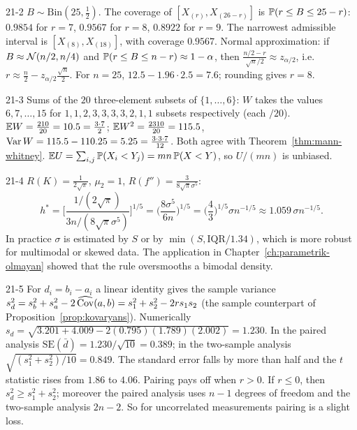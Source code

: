 \begin{solution}{21-2}
$B\sim\text{Bin}(25,\frac12)$. The coverage of $[X_{(r)},X_{(26-r)}]$ is $\P(r\le B\le25-r)$: $0.9854$ for $r=7$, $0.9567$ for $r=8$, $0.8922$ for $r=9$. The narrowest admissible interval is $[X_{(8)},X_{(18)}]$, with coverage $0.9567$. Normal approximation: if $B\approx\Normal(n/2,n/4)$ and $\P(r\le B\le n-r)\approx1-\alpha$, then $\frac{n/2-r}{\sqrt n/2}\approx z_{\alpha/2}$, i.e.\ $r\approx\frac n2-z_{\alpha/2}\frac{\sqrt n}2$. For $n=25$, $12.5-1.96\cdot2.5=7.6$; rounding gives $r=8$.
\end{solution}

\begin{solution}{21-3}
Sums of the $20$ three-element subsets of $\{1,\dots,6\}$: $W$ takes the values $6,7,\dots,15$ for $1,1,2,3,3,3,3,2,1,1$ subsets respectively (each $/20$). $\E W=\frac{210}{20}=10.5=\frac{3\cdot7}2$; $\E W^2=\frac{2310}{20}=115.5$, $\Var W=115.5-110.25=5.25=\frac{3\cdot3\cdot7}{12}$. Both agree with Theorem~\ref{thm:mann-whitney}. $\E U=\sum_{i,j}\P(X_i<Y_j)=mn\,\P(X<Y)$, so $U/(mn)$ is unbiased.
\end{solution}

\begin{solution}{21-4}
$R(K)=\frac1{2\sqrt\pi}$, $\mu_2=1$, $R(f'')=\frac3{8\sqrt\pi\sigma^5}$:
\[
h^*=\Big[\frac{1/(2\sqrt\pi)}{3n/(8\sqrt\pi\sigma^5)}\Big]^{1/5}=\Big(\frac{8\sigma^5}{6n}\Big)^{1/5}=\Big(\frac43\Big)^{1/5}\sigma n^{-1/5}\approx1.059\,\sigma n^{-1/5}.
\]
In practice $\sigma$ is estimated by $S$ or by $\min(S,\mathrm{IQR}/1.34)$, which is more robust for multimodal or skewed data. The application in Chapter~\ref{ch:parametrik-olmayan} showed that the rule oversmooths a bimodal density.
\end{solution}

\begin{solution}{21-5}
For $d_i=b_i-a_i$ a linear identity gives the sample variance $s_d^2=s_b^2+s_a^2-2\,\widehat{\Cov}(a,b)=s_1^2+s_2^2-2rs_1s_2$ (the sample counterpart of Proposition~\ref{prop:kovaryans}). Numerically $s_d=\sqrt{3.201+4.009-2(0.795)(1.789)(2.002)}=1.230$. In the paired analysis $\mathrm{SE}(\bar d)=1.230/\sqrt{10}=0.389$; in the two-sample analysis $\sqrt{(s_1^2+s_2^2)/10}=0.849$. The standard error falls by more than half and the $t$ statistic rises from $1.86$ to $4.06$. Pairing pays off when $r>0$. If $r\le0$, then $s_d^2\ge s_1^2+s_2^2$; moreover the paired analysis uses $n-1$ degrees of freedom and the two-sample analysis $2n-2$. So for uncorrelated measurements pairing is a slight loss.
\end{solution}

